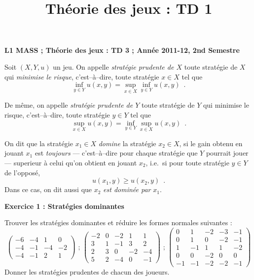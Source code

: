 \documentclass[11pt]{scrartcl}
\title{Th\'eorie des jeux : TD 1}
\date{}
\begin{document}
\pagestyle{empty}

\textbf{L1 MASS ;   Th\'eorie des jeux : TD 3    ;      Ann\'ee 2011-12, 2nd Semestre}
\medskip
\medskip
\medskip

% 

Soit $(X,Y,u)$ un jeu. On appelle \emph{strat\'egie prudente de $X$} toute strat\'egie de $X$ qui \emph{minimise le risque}, 
c'est--\`a--dire, toute strat\'egie $x\in X$ tel que
 \[ \inf_{y\in Y} u(x,y) = \sup_{x\in X} \inf_{y\in Y} u(x,y)  \enspace . \]

De m\^eme, on appelle \emph{strat\'egie prudente de $Y$} toute strat\'egie de $Y$ qui minimise le risque, c'est--\`a--dire,
 toute strat\'egie $y \in Y$ tel que
\[ \sup_{x\in X} u(x,y) = \inf_{y\in Y} \sup_{x\in X} u(x,y) \enspace . \]


On dit que la strat\'egie $x_1\in X$ \emph{domine} la strat\'egie $x_2 \in X$, si le gain obtenu en jouant $x_1$ est \emph{toujours} --- c'est--\`a--dire
 pour chaque strat\'egie que $Y$ pourrait jouer ---
superieur \`a celui qu'on obtient en jouant $x_2$, i.e.\ si pour toute strat\'egie $y\in Y$ de l'oppos\'e, 
 \[ u(x_1, y) \geq u(x_2,y) \enspace . \]
Dans ce cas, on dit aussi que $x_2$ \emph{est domin\'ee par} $x_1$.

\begin{center}
\textbf{Exercice 1 : Strat\'egies dominantes}
\end{center}

Trouver les strat\'egies dominantes et r\'eduire les formes normales suivantes :
\begin{equation*}
\begin{pmatrix}
-6&-4&1&0\\
-4&-1&-4&-2\\
-4&-1&2&1
\end{pmatrix} \text{ ; }
\begin{pmatrix}
-2&0&-2&1&1\\
3&1&-1&3&2\\
2&3&0&-2&-4\\
5&2&-4&0&-1
\end{pmatrix}\text{ ; }
\begin{pmatrix}
0&1&-2&-3&-1\\
0&1&0&-2&-1\\
1&-1&1&1&-2\\
0&0&-2&0&0\\
-1&-1&-2&-2&-1
\end{pmatrix}
\end{equation*}
Donner les strat\'egies prudentes de chacun des joueurs.
\end{document}
